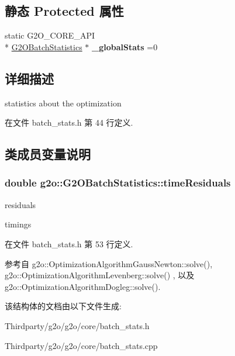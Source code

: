 \subsection*{静态 Protected 属性}
\begin{DoxyCompactItemize}
\item 
\hypertarget{structg2o_1_1G2OBatchStatistics_ab2afc355eadf0e686507ff621f60d3eb}{static G2\-O\-\_\-\-C\-O\-R\-E\-\_\-\-A\-P\-I \\*
\hyperlink{structg2o_1_1G2OBatchStatistics}{G2\-O\-Batch\-Statistics} $\ast$ {\bfseries \-\_\-global\-Stats} =0}\label{structg2o_1_1G2OBatchStatistics_ab2afc355eadf0e686507ff621f60d3eb}

\end{DoxyCompactItemize}


\subsection{详细描述}
statistics about the optimization 

在文件 batch\-\_\-stats.\-h 第 44 行定义.



\subsection{类成员变量说明}
\hypertarget{structg2o_1_1G2OBatchStatistics_a1815f0fb0a84cd1977d72c83cefdb76b}{
\subsubsection[{time\-Residuals}]{\setlength{\rightskip}{0pt plus 5cm}double g2o\-::\-G2\-O\-Batch\-Statistics\-::time\-Residuals}}\label{structg2o_1_1G2OBatchStatistics_a1815f0fb0a84cd1977d72c83cefdb76b}


residuals 

timings 

在文件 batch\-\_\-stats.\-h 第 53 行定义.



参考自 g2o\-::\-Optimization\-Algorithm\-Gauss\-Newton\-::solve(), g2o\-::\-Optimization\-Algorithm\-Levenberg\-::solve() , 以及 g2o\-::\-Optimization\-Algorithm\-Dogleg\-::solve().



该结构体的文档由以下文件生成\-:\begin{DoxyCompactItemize}
\item 
Thirdparty/g2o/g2o/core/batch\-\_\-stats.\-h\item 
Thirdparty/g2o/g2o/core/batch\-\_\-stats.\-cpp\end{DoxyCompactItemize}
